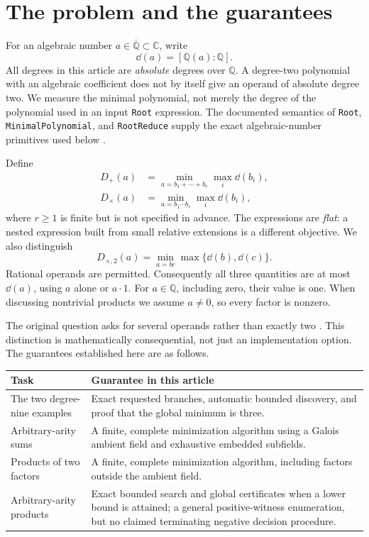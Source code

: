 \documentclass[11pt,a4paper]{article}
\theoremstyle{definition}\newtheorem{definition}[theorem]{Definition}
\theoremstyle{remark}\newtheorem{remark}[theorem]{Remark}
\newcommand{\Q}{\mathbb Q}\newcommand{\C}{\mathbb C}\newcommand{\Z}{\mathbb Z}
\newcommand{\Dsum}{D_{+}}\newcommand{\Dprod}{D_{\times}}\newcommand{\Dtwo}{D_{\times,2}}
\newcommand{\wl}[1]{\texttt{#1}}
\begin{document}
{\small\setlength{\parskip}{0pt}\tableofcontents}
\newpage

\section{The problem and the guarantees}
\label{sec:scope}
For an algebraic number $a\in\overline{\Q}\subset\C$, write
\[
  \dd(a)=[\Q(a):\Q].
\]
All degrees in this article are \emph{absolute} degrees over $\Q$. A degree-two polynomial with an algebraic coefficient does not by itself give an operand of absolute degree two. We measure the minimal polynomial, not merely the degree of the polynomial used in an input \wl{Root} expression. The documented semantics of \wl{Root}, \wl{MinimalPolynomial}, and \wl{RootReduce} supply the exact algebraic-number primitives used below \cite{root,minpoly,rootreduce}.

Define
\begin{align}
 \Dsum(a)&=\min_{a=b_1+\cdots+b_r}\max_i\dd(b_i),\\
 \Dprod(a)&=\min_{a=b_1\cdots b_r}\max_i\dd(b_i),
\end{align}
where $r\ge1$ is finite but is not specified in advance. The expressions are \emph{flat}: a nested expression built from small relative extensions is a different objective. We also distinguish
\[
 \Dtwo(a)=\min_{a=bc}\max\{\dd(b),\dd(c)\}.
\]
Rational operands are permitted. Consequently all three quantities are at most $\dd(a)$, using $a$ alone or $a\cdot1$. For $a\in\Q$, including zero, their value is one. When discussing nontrivial products we assume $a\ne0$, so every factor is nonzero.

The original question asks for several operands rather than exactly two \cite{question}. This distinction is mathematically consequential, not just an implementation option. The guarantees established here are as follows.

\begin{center}
\small
\begin{tabularx}{\linewidth}{@{}p{.24\linewidth}X@{}}
\toprule
Task & Guarantee in this article\\
\midrule
The two degree-nine examples & Exact requested branches, automatic bounded discovery, and proof that the global minimum is three.\\
Arbitrary-arity sums & A finite, complete minimization algorithm using a Galois ambient field and exhaustive embedded subfields.\\
Products of two factors & A finite, complete minimization algorithm, including factors outside the ambient field.\\
Arbitrary-arity products & Exact bounded search and global certificates when a lower bound is attained; a general positive-witness enumeration, but no claimed terminating negative decision procedure.\\
\bottomrule
\end{tabularx}
\end{center}
\end{document}
